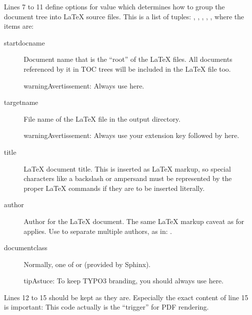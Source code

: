\documentclass[a4paper,10pt,french]{sphinxmanual}
\begin{document}
Lines 7 to 11 define options for value  which determines how to group the document tree into LaTeX
source files. This is a list of tuples: , , , , , where
the items are:
\begin{description}
\item[{startdocname}] \leavevmode
Document name that is the ``root'' of the LaTeX files. All documents referenced by it in TOC trees will be included
in the LaTeX file too.

\begin{sphinxadmonition}{warning}{Avertissement:}
Always use  here.
\end{sphinxadmonition}

\item[{targetname}] \leavevmode
File name of the LaTeX file in the output directory.

\begin{sphinxadmonition}{warning}{Avertissement:}
Always use your extension key followed by  here.
\end{sphinxadmonition}

\item[{title}] \leavevmode
LaTeX document title. This is inserted as LaTeX markup, so special characters like a backslash or ampersand must be
represented by the proper LaTeX commands if they are to be inserted literally.

\item[{author}] \leavevmode
Author for the LaTeX document. The same LaTeX markup caveat as for  applies. Use  to separate
multiple authors, as in: .

\item[{documentclass}] \leavevmode
Normally, one of  or  (provided by Sphinx).

\begin{sphinxadmonition}{tip}{Astuce:}
To keep TYPO3 branding, you should always use  here.
\end{sphinxadmonition}

\end{description}

Lines 12 to 15 should be kept as they are. Especially the exact content of line 15 is important:
This code actually is the ``trigger'' for PDF rendering.
\end{document}
